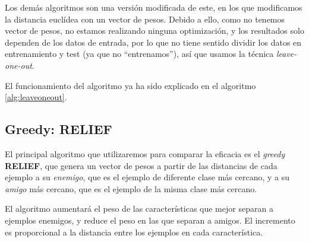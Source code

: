 \documentclass[11pt,a4paper]{article}
\begin{document}
Los demás algoritmos son una versión modificada de este, en los que modificamos la distancia euclídea con un vector de pesos. Debido a ello, como no tenemos vector de pesos, no estamos realizando ninguna optimización, y los resultados solo dependen de los datos de entrada, por lo que no tiene sentido dividir los datos en entrenamiento y test (ya que no ``entrenamos''), así que usamos la técnica \emph{leave-one-out}.

El funcionamiento del algoritmo ya ha sido explicado en el algoritmo \ref{alg:leaveoneout}.

\subsection{Greedy: RELIEF}

El principal algoritmo que utilizaremos para comparar la eficacia es el \emph{greedy} \textbf{RELIEF}, que genera un vector de pesos a partir de las distancias de cada ejemplo a su \emph{enemigo}, que es el ejemplo de diferente clase más cercano, y a su \emph{amigo} más cercano, que es el ejemplo de la misma clase más cercano.

El algoritmo aumentará el peso de las características que mejor separan a ejemplos enemigos, y reduce el peso en las que separan a amigos. El incremento es proporcional a la distancia entre los ejemplos en cada característica.
\end{document}
